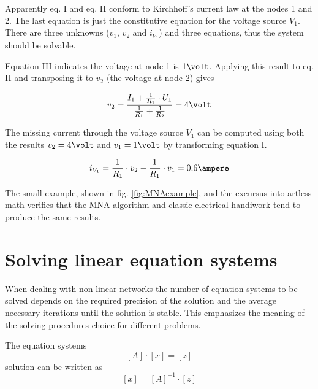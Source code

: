 Apparently eq. I and eq. II conform to Kirchhoff's current law at the
nodes 1 and 2.  The last equation is just the constitutive equation
for the voltage source $V_{1}$.  There are three unknowns ($v_{1}$,
$v_{2}$ and $i_{V_{1}}$) and three equations, thus the system should
be solvable.

\addvspace{12pt}

Equation III indicates the voltage at node 1 is $1\volt$.  Applying
this result to eq. II and transposing it to $v_{2}$ (the voltage at
node 2) gives

\begin{equation}
v_{2} = \frac{I_{1} + \frac{1}{R_{1}}\cdot U_{1}}{\frac{1}{R_{1}} + \frac{1}{R_{2}}} = 4\volt
\end{equation}

The missing current through the voltage source $V_{1}$ can be computed
using both the results $v_{2} = 4\volt$ and $v_{1} = 1\volt$ by
transforming equation I.

\begin{equation}
i_{V_{1}} = \frac{1}{R_{1}}\cdot v_{2} - \frac{1}{R_{1}}\cdot v_{1} = 0.6\ampere
\end{equation}

The small example, shown in fig. \ref{fig:MNAexample}, and the
excursus into artless math verifies that the MNA algorithm and classic
electrical handiwork tend to produce the same results.

\section{Solving linear equation systems}

When dealing with non-linear networks the number of equation systems
to be solved depends on the required precision of the solution and the
average necessary iterations until the solution is stable.  This
emphasizes the meaning of the solving procedures choice for different
problems.

\addvspace{12pt}

The equation systems
\begin{equation}
\left[A\right] \cdot \left[x\right] = \left[z\right]
\end{equation}
solution can be written as
\begin{equation}
\left[x\right] = \left[A\right]^{-1} \cdot \left[z\right]
\end{equation}

